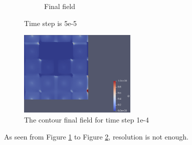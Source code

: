\documentclass{article}
\begin{document}
\begin{figure}[hbt!]
\begin{subfigure}{0.4\textwidth}
        \caption{Final field}
  \end{subfigure}
  \caption{Time step is 5e-5}
  \label{t2m2_1} 
\end{figure}

\begin{figure}[hbt!]
    \centering
    \includegraphics[width=0.5\textwidth]{Figures/5e-5 40x40/contour.png}
    \caption{The contour final field for time step 1e-4}
    \label{t2m2_2} 
\end{figure}

As seen from Figure \ref{t2m2_1} to Figure \ref{t2m2_2}, resolution is not enough. 

\clearpage
\end{document}
